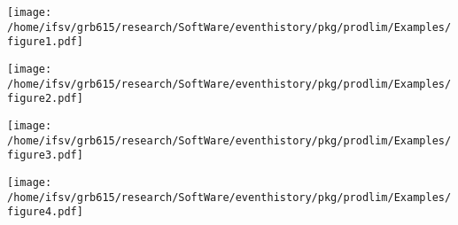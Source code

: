 \documentclass[11pt]{article}
\author{Thomas Alexander Gerds}
\date{\today}
\title{}
\begin{document}
\texttt{[image: /home/ifsv/grb615/research/SoftWare/eventhistory/pkg/prodlim/Examples/figure1.pdf]}


\texttt{[image: /home/ifsv/grb615/research/SoftWare/eventhistory/pkg/prodlim/Examples/figure2.pdf]}

\texttt{[image: /home/ifsv/grb615/research/SoftWare/eventhistory/pkg/prodlim/Examples/figure3.pdf]}


\texttt{[image: /home/ifsv/grb615/research/SoftWare/eventhistory/pkg/prodlim/Examples/figure4.pdf]}
\end{document}
